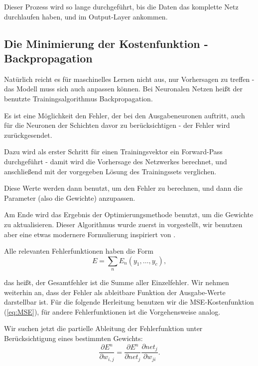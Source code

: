 Dieser Prozess wird so lange durchgeführt, bis die Daten das komplette Netz durchlaufen haben, und im Output-Layer ankommen\cite{bishop1995neural}.


\subsection{Die Minimierung der Kostenfunktion - Backpropagation}

Natürlich reicht es für maschinelles Lernen nicht aus, nur Vorhersagen zu treffen - das Modell muss sich auch anpassen können. Bei Neuronalen Netzen heißt der benutzte Trainingsalgorithmus Backpropagation.

Es ist eine Möglichkeit den Fehler, der bei den Ausgabeneuronen auftritt, auch für die Neuronen der Schichten davor zu berücksichtigen - der Fehler wird zurückgesendet.

Dazu wird als erster Schritt für einen Trainingsvektor ein Forward-Pass durchgeführt - damit wird die Vorhersage des Netzwerkes berechnet, und anschließend mit der vorgegeben Lösung des Trainingssets verglichen.

Diese Werte werden dann benutzt, um den Fehler zu berechnen, und dann die Parameter (also die Gewichte) anzupassen.

Am Ende wird das Ergebnis der Optimierungsmethode benutzt, um die Gewichte zu aktualisieren. Dieser Algorithmus wurde zuerst in \cite{rumelhart1988learning} vorgestellt, wir benutzen aber eine etwas modernere Formulierung inspiriert von \cite{bishop1995neural, duda2012pattern}. 

Alle relevanten Fehlerfunktionen haben die Form 
\begin{equation}
E = \sum_n E_n(y_1, \ldots, y_c),
\end{equation}

das heißt, der Gesamtfehler ist die Summe aller Einzelfehler.
Wir nehmen weiterhin an, dass der Fehler als ableitbare Funktion der Ausgabe-Werte darstellbar ist.
Für die folgende Herleitung benutzen wir die MSE-Kostenfunktion (\ref{eq:MSE}), für andere Fehlerfunktionen ist die Vorgehensweise analog.

Wir suchen jetzt die partielle Ableitung der Fehlerfunktion unter Berücksichtigung eines bestimmten Gewichts:
\begin{equation}
\frac{\partial E^n}{\partial w_{i,j}} = \frac{\partial E^n}{\partial net_j}  \frac{\partial net_j }{\partial w_{ji}}.
\end{equation}


